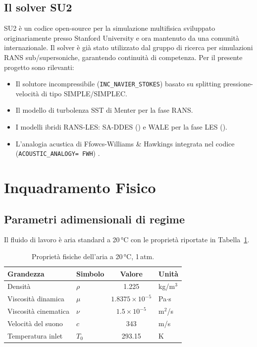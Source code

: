 \documentclass[11pt,a4paper]{article}
\newcommand{\ttcfg}[1]{\texttt{\color{codegray}#1}}
\begin{document}
\subsection{Il solver SU2}

SU2 \cite{Economon2016} è un codice open-source per la simulazione multifisica sviluppato originariamente presso Stanford University e ora mantenuto da una comunità internazionale. Il solver è già stato utilizzato dal gruppo di ricerca per simulazioni RANS sub/supersoniche, garantendo continuità di competenza. Per il presente progetto sono rilevanti:

\begin{itemize}
  \item Il solutore incompressibile (\ttcfg{INC\_NAVIER\_STOKES}) basato su splitting pressione-velocità di tipo SIMPLE/SIMPLEC.
  \item Il modello di turbolenza SST di Menter per la fase RANS.
  \item I modelli ibridi RANS-LES: SA-DDES (\cite{Spalart2006}) e WALE per la fase LES (\cite{Nicoud1999}).
  \item L'analogia acustica di Ffowcs-Williams \& Hawkings integrata nel codice (\ttcfg{ACOUSTIC\_ANALOGY= FWH}) \cite{Zhou2018}.
\end{itemize}

\section{Inquadramento Fisico}
\label{sec:fisica}

\subsection{Parametri adimensionali di regime}

Il fluido di lavoro è aria standard a 20\,°C con le proprietà riportate in Tabella~\ref{tab:fluid}.

\begin{table}[H]
  \centering
  \caption{Proprietà fisiche dell'aria a 20\,°C, 1\,atm.}
  \label{tab:fluid}
  \begin{tabular}{llcl}
    \toprule
    \rowcolor{tablehead}
    \textbf{Grandezza} & \textbf{Simbolo} & \textbf{Valore} & \textbf{Unità} \\
    \midrule
    Densità           & $\rho$          & 1.225          & kg/m$^3$ \\
    Viscosità dinamica & $\mu$          & $1.8375\times10^{-5}$ & Pa$\cdot$s \\
    Viscosità cinematica & $\nu$        & $1.5\times10^{-5}$ & m$^2$/s \\
    Velocità del suono & $c$            & 343            & m/s \\
    Temperatura inlet  & $T_0$          & 293.15         & K \\
    \bottomrule
  \end{tabular}
\end{table}
\end{document}
